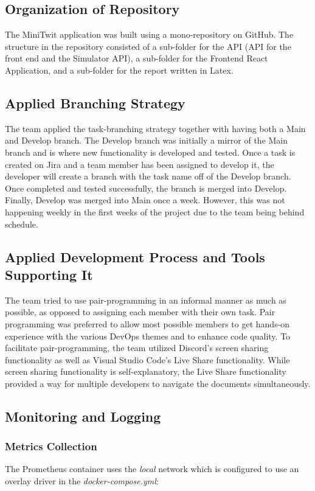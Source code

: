 \subsection{Organization of Repository}
The MiniTwit application was built using a mono-repository on GitHub. The structure in the repository consisted of a sub-folder for the API (API for the front end and the Simulator API), a sub-folder for the Frontend React Application, and a sub-folder for the report written in Latex. 

\subsection{Applied Branching Strategy}
The team applied the task-branching strategy\cite{branching} together with having both a Main and Develop branch. The Develop branch was initially a mirror of the Main branch and is where new functionality is developed and tested. Once a task is created on Jira and a team member has been assigned to develop it, the developer will create a branch with the task name off of the Develop branch. Once completed and tested successfully, the branch is merged into Develop. Finally, Develop was merged into Main once a week. However, this was not happening weekly in the first weeks of the project due to the team being behind schedule. 

\subsection{Applied Development Process and Tools Supporting It}
The team tried to use pair-programming in an informal manner as much as possible, as opposed to assigning each member with their own task. Pair programming was preferred to allow most possible members to get hands-on experience with the various DevOps themes and to enhance code quality. To facilitate pair-programming, the team utilized Discord's screen sharing functionality as well as Visual Studio Code's Live Share functionality\cite{live_share}. While screen sharing functionality is self-explanatory, the Live Share functionality provided a way for multiple developers to navigate the documents simultaneously. 

\subsection{Monitoring and Logging}

\subsubsection{Metrics Collection}
The Prometheus container uses the \textit{local} network which is configured to use an overlay driver in the \textit{docker-compose.yml}:

